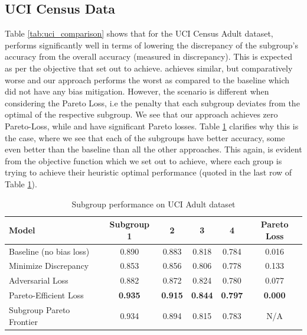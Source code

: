 \subsection{UCI Census Data}
Table \ref{tab:uci_comparison} shows that for the UCI Census Adult dataset, \cite{Zhao2017MenAL} performs significantly well in terms of lowering the discrepancy of the subgroup's accuracy from the overall accuracy (measured in discrepancy). This is expected as per the objective that \cite{Zhao2017MenAL} set out to achieve. \cite{Beutel2017DataDA} achieves similar, but comparatively worse and our approach performs the worst as compared to the baseline which did not have any bias mitigation. However, the scenario is different when considering the Pareto Loss, i.e the penalty that each subgroup deviates from the optimal of the respective subgroup. We see that our approach achieves zero Pareto-Loss, while \cite{Zhao2017MenAL} and \cite{Beutel2017DataDA} have significant Pareto losses. Table \ref{tab:uci_subgroups} clarifies why this is the case, where we see that each of the subgroups have better accuracy, some even better than the baseline than all the other approaches. This again, is evident from the objective function which we set out to achieve, where each group is trying to achieve their heuristic optimal performance (quoted in the last row of Table \ref{tab:uci_subgroups}).

\begin{table}[tp]
\footnotesize
\caption{Subgroup performance on UCI Adult dataset}
\begin{center}
\begin{tabular}{lccccc}
\hline
\textbf{Model} & \textbf{Subgroup 1} & \textbf{2} & \textbf{3} & \textbf{4} & \textbf{Pareto Loss}\\\hline
Baseline (no bias loss) & 0.890 & 0.883 & 0.818 & 0.784 & 0.016\\
Minimize Discrepancy & 0.853 & 0.856 & 0.806 & 0.778 & 0.133\\
Adversarial Loss & 0.882 & 0.872 & 0.824 & 0.780 & 0.077\\
Pareto-Efficient Loss & \textbf{0.935} & \textbf{0.915} & \textbf{0.844} & \textbf{0.797} & \textbf{0.000}\\
Subgroup Pareto Frontier & 0.934 & 0.894 & 0.815 & 0.783 & N/A \\\hline
\end{tabular}
\end{center}
\label{tab:uci_subgroups}
\normalsize
\end{table}%

